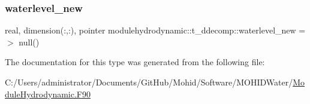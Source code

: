 \subsubsection{\texorpdfstring{waterlevel\+\_\+new}{waterlevel\_new}}
{\footnotesize\ttfamily real, dimension(\+:,\+:), pointer modulehydrodynamic\+::t\+\_\+ddecomp\+::waterlevel\+\_\+new =$>$ null()\hspace{0.3cm}{\ttfamily [private]}}



The documentation for this type was generated from the following file\+:\begin{DoxyCompactItemize}
\item 
C\+:/\+Users/administrator/\+Documents/\+Git\+Hub/\+Mohid/\+Software/\+M\+O\+H\+I\+D\+Water/\mbox{\hyperlink{_module_hydrodynamic_8_f90}{Module\+Hydrodynamic.\+F90}}\end{DoxyCompactItemize}
